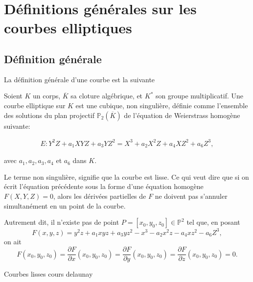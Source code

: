 \chapter{Définitions générales sur les courbes elliptiques}

\section{Définition générale}

La définition générale d'une courbe est la suivante
\begin{definition}
    Soient $K$ un corps, $\overline{K}$ sa cloture algébrique, et $K^{*}$ son groupe
    multiplicatif. Une courbe elliptique sur $K$ est une cubique, non singulière,
    définie comme l'ensemble des solutions du plan projectif $\mathbb{P}_{2}(\overline{K})$ de
    l'équation de Weierstrass homogène suivante:

\begin{align}
\label{eq:geneEll}
E: Y^2Z+a_1XYZ+a_3YZ^2 = X^3 +a_2X^2Z+a_4XZ^2+a_6Z^3
,\end{align}

avec $a_1,a_2,a_3,a_4$ et $a_6$ dans $K$.
\end{definition}
Le terme non singulière, signifie que la courbe est lisse. Ce qui veut dire que si on écrit
l'équation précédente sous la forme d'une équation homogène $F(X,Y,Z)=0$, alors les dérivées
partielles de $F$ ne doivent pas s'annuler simultanément en un point de la courbe.

Autrement dit, il n'existe pas de point $P = \left[ x_0,y_0,z_0 \right] \in \mathbb{P}^2$ tel
que, en posant
\[
F(x,y,z) = y^2z+a_1xyz+a_3yz^2 - x^3-a_2x^2z-a_4xz^2-a_6Z^3
,\] 
on ait
\[
F(x_0,y_0,z_0)=\frac{\partial{F}}{\partial{x}}(x_0,y_0,z_0) =
\frac{\partial{F}}{\partial{y}}(x_0,y_0,z_0) =
\frac{\partial{F}}{\partial{z}}(x_0,y_0,z_0) = 0
.\] 

\begin{exemples}
    Courbes lisses cours delaunay
\end{exemples}



